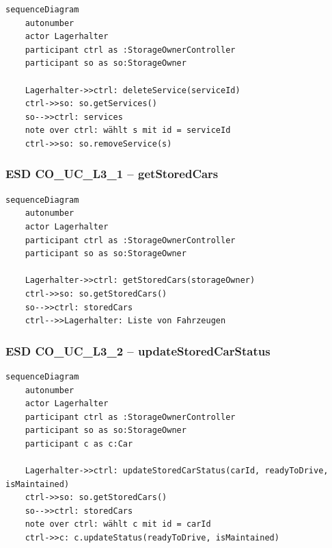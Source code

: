 \begin{lstlisting}[basicstyle=\ttfamily\small, breaklines=true]
sequenceDiagram
    autonumber
    actor Lagerhalter
    participant ctrl as :StorageOwnerController
    participant so as so:StorageOwner

    Lagerhalter->>ctrl: deleteService(serviceId)
    ctrl->>so: so.getServices()
    so-->>ctrl: services
    note over ctrl: wählt s mit id = serviceId
    ctrl->>so: so.removeService(s)
\end{lstlisting}

\newpage

{}
\subsubsection*{ESD CO\_UC\_L3\_1 – getStoredCars}

\begin{lstlisting}[basicstyle=\ttfamily\small, breaklines=true]
sequenceDiagram
    autonumber
    actor Lagerhalter
    participant ctrl as :StorageOwnerController
    participant so as so:StorageOwner

    Lagerhalter->>ctrl: getStoredCars(storageOwner)
    ctrl->>so: so.getStoredCars()
    so-->>ctrl: storedCars
    ctrl-->>Lagerhalter: Liste von Fahrzeugen
\end{lstlisting}

\newpage

{}
\subsubsection*{ESD CO\_UC\_L3\_2 – updateStoredCarStatus}

\begin{lstlisting}[basicstyle=\ttfamily\small, breaklines=true]
sequenceDiagram
    autonumber
    actor Lagerhalter
    participant ctrl as :StorageOwnerController
    participant so as so:StorageOwner
    participant c as c:Car

    Lagerhalter->>ctrl: updateStoredCarStatus(carId, readyToDrive, isMaintained)
    ctrl->>so: so.getStoredCars()
    so-->>ctrl: storedCars
    note over ctrl: wählt c mit id = carId
    ctrl->>c: c.updateStatus(readyToDrive, isMaintained)
\end{lstlisting}

